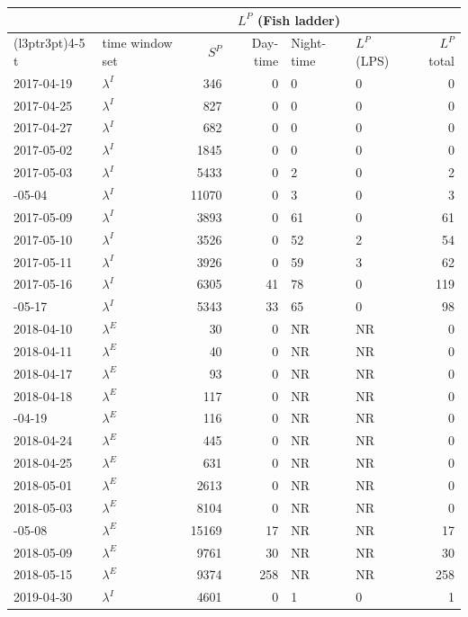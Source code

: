 \documentclass[
]{article}
\begin{document}
\begin{longtable}{llrrllr}
\toprule
\multicolumn{3}{c}{ } & \multicolumn{2}{c}{$L^P$ (Fish ladder)} & \multicolumn{2}{c}{ } \\
\cmidrule(l{3pt}r{3pt}){4-5}
t & time window set & $S^P$ & Day-time & Night-time & $L^P$ (LPS) & $L^P$ total\\
\midrule
2017-04-19 & $\lambda^I$ & 346 & 0 & 0 & 0 & 0\\
2017-04-25 & $\lambda^I$ & 827 & 0 & 0 & 0 & 0\\
2017-04-27 & $\lambda^I$ & 682 & 0 & 0 & 0 & 0\\
2017-05-02 & $\lambda^I$ & 1845 & 0 & 0 & 0 & 0\\
2017-05-03 & $\lambda^I$ & 5433 & 0 & 2 & 0 & 2\\
\addlinespace
2017-05-04 & $\lambda^I$ & 11070 & 0 & 3 & 0 & 3\\
2017-05-09 & $\lambda^I$ & 3893 & 0 & 61 & 0 & 61\\
2017-05-10 & $\lambda^I$ & 3526 & 0 & 52 & 2 & 54\\
2017-05-11 & $\lambda^I$ & 3926 & 0 & 59 & 3 & 62\\
2017-05-16 & $\lambda^I$ & 6305 & 41 & 78 & 0 & 119\\
\addlinespace
2017-05-17 & $\lambda^I$ & 5343 & 33 & 65 & 0 & 98\\
2018-04-10 & $\lambda^E$ & 30 & 0 & NR & NR & 0\\
2018-04-11 & $\lambda^E$ & 40 & 0 & NR & NR & 0\\
2018-04-17 & $\lambda^E$ & 93 & 0 & NR & NR & 0\\
2018-04-18 & $\lambda^E$ & 117 & 0 & NR & NR & 0\\
\addlinespace
2018-04-19 & $\lambda^E$ & 116 & 0 & NR & NR & 0\\
2018-04-24 & $\lambda^E$ & 445 & 0 & NR & NR & 0\\
2018-04-25 & $\lambda^E$ & 631 & 0 & NR & NR & 0\\
2018-05-01 & $\lambda^E$ & 2613 & 0 & NR & NR & 0\\
2018-05-03 & $\lambda^E$ & 8104 & 0 & NR & NR & 0\\
\addlinespace
2018-05-08 & $\lambda^E$ & 15169 & 17 & NR & NR & 17\\
2018-05-09 & $\lambda^E$ & 9761 & 30 & NR & NR & 30\\
2018-05-15 & $\lambda^E$ & 9374 & 258 & NR & NR & 258\\
2019-04-30 & $\lambda^I$ & 4601 & 0 & 1 & 0 & 1\\

\end{longtable}
\end{document}
